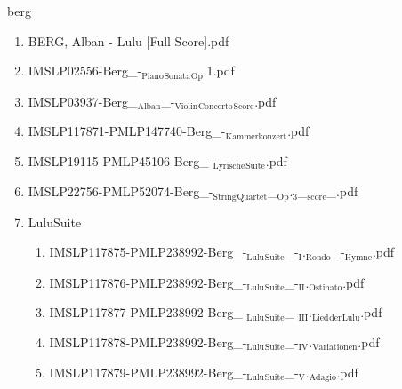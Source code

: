 \documentclass[11pt]{article}
\begin{document}
\item berg
\label{sec-1-1-1-1-44-10}
\begin{enumerate}
\item BERG, Alban - Lulu [Full Score].pdf
\label{sec-1-1-1-1-44-10-1}

\item IMSLP02556-Berg\_-$_{\text{Piano}}$$_{\text{Sonata}}$$_{\text{Op}}$.1.pdf
\label{sec-1-1-1-1-44-10-2}

\item IMSLP03937-Berg\_$_{\text{Alban}}$\_-$_{\text{Violin}}$$_{\text{Concerto}}$$_{\text{Score}}$.pdf
\label{sec-1-1-1-1-44-10-3}

\item IMSLP117871-PMLP147740-Berg\_-$_{\text{Kammerkonzert}}$.pdf
\label{sec-1-1-1-1-44-10-4}

\item IMSLP19115-PMLP45106-Berg\_-$_{\text{Lyrische}}$$_{\text{Suite}}$.pdf
\label{sec-1-1-1-1-44-10-5}

\item IMSLP22756-PMLP52074-Berg\_-$_{\text{String}}$$_{\text{Quartet}}$\_$_{\text{Op}}$.$_{\text{3}}$\_$_{\text{score}}$\_.pdf
\label{sec-1-1-1-1-44-10-6}

\item LuluSuite
\label{sec-1-1-1-1-44-10-7}
\begin{enumerate}
\item IMSLP117875-PMLP238992-Berg\_-$_{\text{Lulu}}$$_{\text{Suite}}$\_-$_{\text{I}}$.$_{\text{Rondo}}$\_-$_{\text{Hymne}}$.pdf
\label{sec-1-1-1-1-44-10-7-1}

\item IMSLP117876-PMLP238992-Berg\_-$_{\text{Lulu}}$$_{\text{Suite}}$\_-$_{\text{II}}$.$_{\text{Ostinato}}$.pdf
\label{sec-1-1-1-1-44-10-7-2}

\item IMSLP117877-PMLP238992-Berg\_-$_{\text{Lulu}}$$_{\text{Suite}}$\_-$_{\text{III}}$.$_{\text{Lied}}$$_{\text{der}}$$_{\text{Lulu}}$.pdf
\label{sec-1-1-1-1-44-10-7-3}

\item IMSLP117878-PMLP238992-Berg\_-$_{\text{Lulu}}$$_{\text{Suite}}$\_-$_{\text{IV}}$.$_{\text{Variationen}}$.pdf
\label{sec-1-1-1-1-44-10-7-4}

\item IMSLP117879-PMLP238992-Berg\_-$_{\text{Lulu}}$$_{\text{Suite}}$\_-$_{\text{V}}$.$_{\text{Adagio}}$.pdf
\label{sec-1-1-1-1-44-10-7-5}
\end{enumerate}
\end{enumerate}
\end{document}
